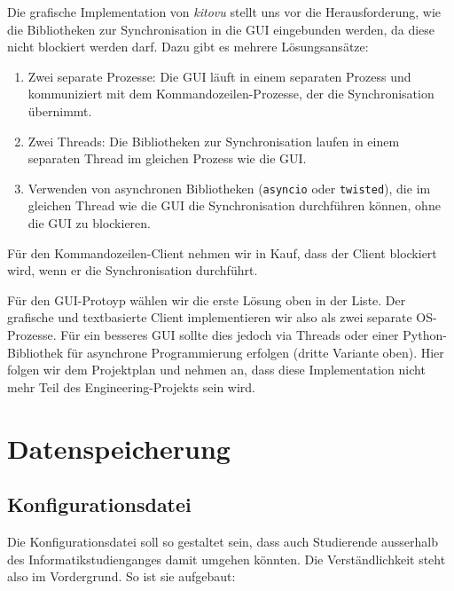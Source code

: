 \documentclass[a4paper]{article}
\let\oldsection\section
\renewcommand\section{\clearpage\oldsection}
\begin{document}

Die grafische Implementation von \emph{kitovu} stellt uns vor die Herausforderung, wie die Bibliotheken zur Synchronisation in die GUI eingebunden werden, da diese nicht blockiert werden darf. Dazu gibt es mehrere Lösungsansätze:

\begin{enumerate}
	\item Zwei separate Prozesse: Die GUI läuft in einem separaten Prozess und kommuniziert mit dem Kommandozeilen-Prozesse, der die Synchronisation übernimmt.
	\item Zwei Threads: Die Bibliotheken zur Synchronisation laufen in einem separaten Thread im gleichen Prozess wie die GUI.
	\item Verwenden von asynchronen Bibliotheken (\verb|asyncio| oder \verb|twisted|), die im gleichen Thread wie die GUI die Synchronisation durchführen können, ohne die GUI zu blockieren.
\end{enumerate}

Für den Kommandozeilen-Client nehmen wir in Kauf, dass der Client blockiert wird, wenn er die Synchronisation durchführt.

Für den GUI-Protoyp wählen wir die erste Lösung oben in der Liste. Der grafische und textbasierte Client implementieren wir also als zwei separate OS-Prozesse. Für ein besseres GUI sollte dies jedoch via Threads oder einer Python-Bibliothek für asynchrone Programmierung erfolgen (dritte Variante oben). Hier folgen wir dem Projektplan und nehmen an, dass diese Implementation nicht mehr Teil des Engineering-Projekts sein wird.

\section{Datenspeicherung}

\subsection{Konfigurationsdatei}
Die Konfigurationsdatei soll so gestaltet sein, dass auch Studierende ausserhalb des Informatikstudienganges damit umgehen könnten. Die Verständlichkeit steht also im Vordergrund. So ist sie aufgebaut:
\end{document}
